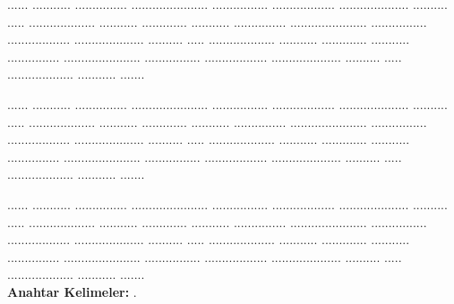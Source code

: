 \begin{spacing}{1.25}
	\begin{justify}
		\begin{footnotesize}
%			
%	

\setlength{\parindent}{1cm}
\hspace{1cm}...... ........... ............... ...................... ................ .................. .................... .......... ..... ................... ........... ............. ........... ............... ...................... ................ .................. .................... .......... ..... ................... ........... ............. ........... ............... ...................... ................ .................. .................... .......... ..... ................... ........... .......

...... ........... ............... ...................... ................ .................. .................... .......... ..... ................... ........... ............. ........... ............... ...................... ................ .................. .................... .......... ..... ................... ........... ............. ........... ............... ...................... ................ .................. .................... .......... ..... ................... ........... .......

...... ........... ............... ...................... ................ .................. .................... .......... ..... ................... ........... ............. ........... ............... ...................... ................ .................. .................... .......... ..... ................... ........... ............. ........... ............... ...................... ................ .................. .................... .......... ..... ................... ........... .......\\


\noindent
\textbf{Anahtar Kelimeler:} \anahtarkelimeler .
		\end{footnotesize}
	\end{justify}
\end{spacing}
\newpage


